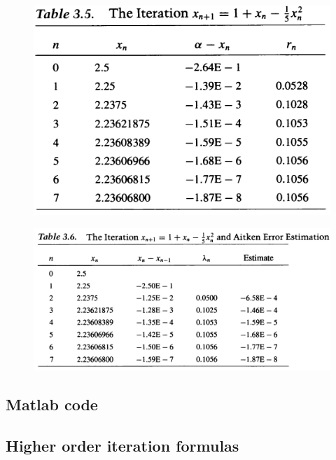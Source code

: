 \documentclass[12pt]{article}
\theoremstyle{theorem}
\begin{document}
\begin{figure}[H]
\centering
\includegraphics[scale=1.0]{Figures/screenshot0010}
\label{fig:screenshot0010}
\end{figure}

\begin{figure}[H]
\centering
\includegraphics[scale=1.0]{Figures/screenshot0011}
\label{fig:screenshot0011}
\end{figure}

\subsection{Matlab code}
\begin{shaded}
	
\end{shaded}

\subsection{Higher order iteration formulas}
\end{document}
